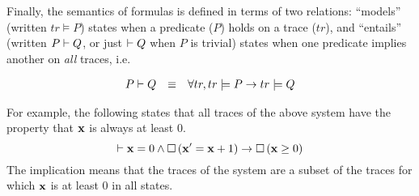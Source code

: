 Finally, the semantics of formulas is defined in terms of two relations:
``models'' (written $tr \models P$) states when a predicate ($P$) holds on
a trace ($tr$), and ``entails'' (written $P \vdash Q$, or just $\vdash
Q$ when $P$ is trivial) states when one predicate implies another on
\emph{all} traces, i.e.
\begin{definition}
\[\begin{array}{rcl}
P \vdash Q & \equiv & \forall tr, tr \models P \rightarrow tr \models Q
\end{array}
\]
\label{def:ltl-entails}
\end{definition}
For example, the following states that all traces of the above system have
the property that $\mathbf{x}$ is always at least 0.
\[
\vdash \mathbf{x} = 0 \wedge \Box{} \left(\mathbf{x}^\prime = \mathbf{x} + 1\right) \rightarrow \Box{} \left(\mathbf{x} \geq 0\right)
\]
The implication means that the traces of the system are a subset of the
traces for which $\mathbf{x}$ is at least 0 in all states.

